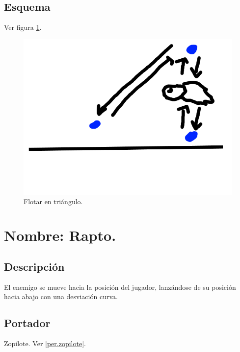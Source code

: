 		\subsection{Esquema}
		Ver figura \ref{fig:flotarT}.
		\begin{figure}
			\centering
			\includegraphics[height=0.2 \textheight]{Imagenes/flotarT}
			\caption{Flotar en triángulo.}
			\label{fig:flotarT}
		\end{figure}

	\section{Nombre: Rapto.} \label{hab.rapto}
		\subsection{Descripción}
		El enemigo se mueve hacia la posición del jugador, lanzándose de su posición hacia abajo con una desviación curva.
		\subsection{Portador}
		Zopilote. Ver \ref{per.zopilote}.
